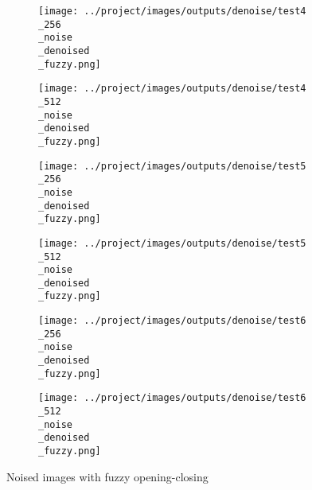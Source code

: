 \begin{figure}[!ht]
\begin{subfigure}[t]{0.15\textwidth}
    \texttt{[image: ../project/images/outputs/denoise/test4\\\_256\\\_noise\\\_denoised\\\_fuzzy.png]}
    \caption{}
    \centering
  \end{subfigure}
\begin{subfigure}[t]{0.15\textwidth}
    \texttt{[image: ../project/images/outputs/denoise/test4\\\_512\\\_noise\\\_denoised\\\_fuzzy.png]}
    \caption{}
    \centering
  \end{subfigure}
\begin{subfigure}[t]{0.15\textwidth}
    \texttt{[image: ../project/images/outputs/denoise/test5\\\_256\\\_noise\\\_denoised\\\_fuzzy.png]}
    \caption{}
    \centering
  \end{subfigure}
\begin{subfigure}[t]{0.15\textwidth}
    \texttt{[image: ../project/images/outputs/denoise/test5\\\_512\\\_noise\\\_denoised\\\_fuzzy.png]}
    \caption{}
    \centering
  \end{subfigure}
\begin{subfigure}[t]{0.15\textwidth}
    \texttt{[image: ../project/images/outputs/denoise/test6\\\_256\\\_noise\\\_denoised\\\_fuzzy.png]}
    \caption{}
    \centering
  \end{subfigure}
\begin{subfigure}[t]{0.15\textwidth}
    \texttt{[image: ../project/images/outputs/denoise/test6\\\_512\\\_noise\\\_denoised\\\_fuzzy.png]}
    \caption{}
    \centering
  \end{subfigure}
 \caption{Noised images with fuzzy opening-closing}
 \end{figure}
